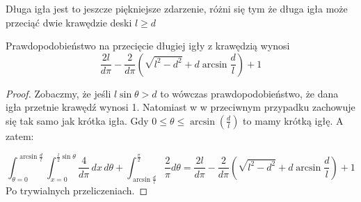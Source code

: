 \begin{definition}
    Długa igła jest to jeszcze piękniejsze zdarzenie, różni się tym że długa igła może przeciąć dwie krawędzie deski \( l \geq d \)
\end{definition}

\begin{theorem}
    Prawdopodobieństwo na przecięcie długiej igły z krawędzią wynosi 
    \[
        \frac{2l}{d\pi} - \frac{2}{d\pi}\left(\sqrt{l^2 - d^2} + d\arcsin\frac{d}{l}\right) + 1
    \]
\end{theorem}

\begin{proof}
    Zobaczmy, że jeśli \( l\sin{\theta} > d\) to wówczas prawdopodobieństwo, że dana igła przetnie krawędź wynosi 1. Natomiast w w przeciwnym przypadku zachowuje się tak samo jak krótka igła. Gdy \( 0 \leq \theta \leq \arcsin\left({\frac{d}{l}}\right) \) to mamy krótką igłę. A zatem:
    
    \[
        \int_{\theta=0}^{\arcsin{\frac{d}{l}}} \int_{x=0}^{\frac{l}{2}\sin{\theta}} \frac{4}{d\pi} \, dx\, d\theta + \int_{\arcsin{\frac{d}{l}}}^{\frac{\pi}{2}} \frac{2}{\pi} d\theta = 
        \frac{2l}{d\pi} - \frac{2}{d\pi}\left(\sqrt{l^2 - d^2} + d\arcsin\frac{d}{l}\right) + 1
    \]
    Po trywialnych przeliczeniach.

\end{proof}